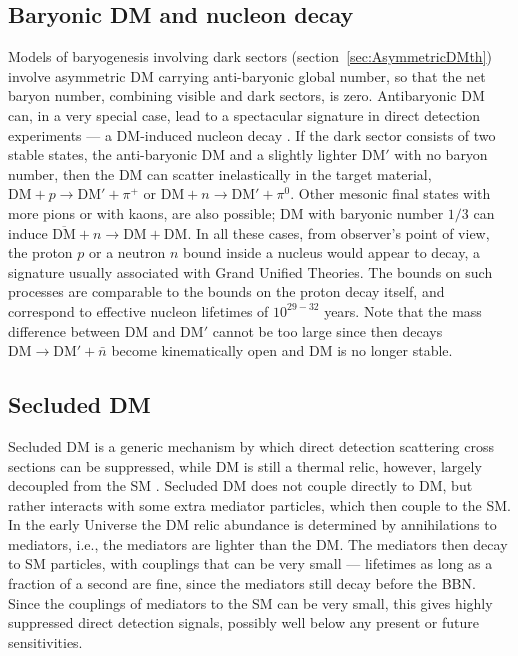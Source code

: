 \subsection{Baryonic DM and nucleon decay}
Models of baryogenesis  involving dark sectors (section~\ref{sec:AsymmetricDMth}) involve
asymmetric DM carrying anti-baryonic global number, so that the net baryon number, combining visible and dark sectors, is zero.
Antibaryonic DM  can, in a very special case, lead to a spectacular signature in direct detection experiments --- a DM-induced nucleon decay \cite{baryon:decay:asym:DM}. 
If the dark sector consists of two stable states, the anti-baryonic DM and a slightly lighter DM$'$ with no baryon number, 
then the DM can scatter inelastically in the target material, $\text{DM}+p\to \text{DM}'+\pi^+$ or $\text{DM}+n\to \text{DM}'+\pi^0$.
Other mesonic final states with more pions or with kaons, are also possible;
DM with baryonic number $1/3$ can induce $\overline{\text{DM}}+n\to \text{DM}+\text{DM}$.
In all these cases, from observer's point of view, the proton $p$ or a neutron $n$ bound inside a nucleus would appear to decay, a signature usually associated with Grand Unified Theories.  The bounds on such processes are comparable to the bounds on the proton decay itself, and correspond to effective nucleon lifetimes of $10^{29-32}$ years. Note that the mass difference between DM and DM$'$ cannot be too large 
since then decays $\text{DM}\to \text{DM}'+\bar n$ become kinematically open and DM is no longer stable.



\subsection{Secluded DM}
Secluded DM is a generic mechanism by which direct detection scattering cross sections can be suppressed, while DM is still a thermal relic, however, largely decoupled from the SM \cite{secluded:DM}. Secluded DM does not couple directly to DM, but rather interacts with some extra mediator particles, 
which then couple to the SM. 
In the early Universe the DM relic abundance is determined by annihilations to mediators, i.e., the mediators are lighter than the DM. 
The mediators then decay to SM particles, with couplings that can be very small --- 
lifetimes as long as a fraction of a second are fine, since the mediators still decay before the BBN. 
Since the couplings of mediators to the SM can be very small, this gives highly suppressed direct detection signals, 
possibly well below any present or future sensitivities. 



